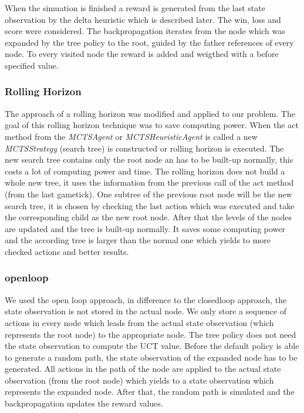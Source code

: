 
When the simuation is finished a reward is generated from the last state observation by the delta heuristic which is described later. The win, loss and score were considered.
The backpropagation iterates from the node which was expanded by the tree policy to the root, guided by the father references of every node. To every visited node the reward is added and weigthed with a before specified value.

\subsubsection{Rolling Horizon}

The approach of a rolling horizon was modified and applied to our problem. The goal of this rolling horizon technique was to save computing power. 
When the act method from the \textit{MCTSAgent} or \textit{MCTSHeuristicAgent} is called a new \textit{MCTSStrategy} (search tree) is constructed or rolling horizon is executed. The new search tree contains only the root node an has to be built-up normally, this costs a lot of computing power and time. The rolling horizon does not build a whole new tree, it uses the information from the previous call of the act method (from the last gametick). 
One subtree of the previous root node will be the new search tree, it is chosen by checking the last action which was executed and take the corresponding child as the new root node.
After that the levels of the nodes are updated and the tree is built-up normally. It saves some computing power and the according tree is larger than the normal one which yields to more checked actions and better results.  

\subsubsection{openloop}

We used the open loop approach, in difference to the closedloop approach, the state observation is not stored in the actual node. We only store a sequence of actions in every node which leads from the actual state observation (which represents the root node) to the appropriate node. The tree policy does not need the state observation to compute the \ac{UCT} value. 
Before the default policy is able to generate a random path, the state observation of the expanded node has to be generated. All actions in the path of the node are applied to the actual state observation (from the root node) which yields to a state observation which represents the expanded node. After that, the random path is simulated and the backpropagation updates the reward values.

